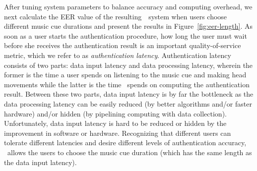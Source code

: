 After tuning system parameters to balance accuracy and computing overhead, we next calculate the EER value of the resulting~\systemname~system when users choose different music cue durations and present the results in Figure~\ref{fig:eer-length}. As soon as a user starts the authentication procedure, how long the user must wait before she receives the authentication result is an important quality-of-service metric, which we refer to as \emph{authentication latency}.  Authentication latency consists of two parts: data input latency and data processing latency, wherein the former is the time a user spends on listening to the music cue and making head movements while the latter is the time \systemname~spends on computing the authentication result. Between these two parts, data input latency is by far the bottleneck as the data processing latency can be easily reduced (by better algorithms and/or faster hardware) and/or hidden (by pipelining computing with data collection). Unfortunately, data input latency is hard to be reduced or hidden by the improvement in software or hardware. Recognizing that different users can tolerate different latencies and desire different levels of authentication accuracy, \systemname~allows the users to choose the music cue duration (which has the same length as the data input latency).

